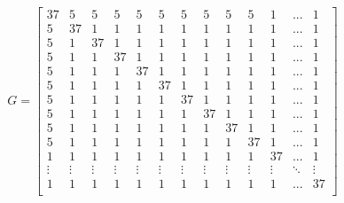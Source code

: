 \[G=
\left[
\begin{smallmatrix}
37 & 5 & 5 & 5 & 5 & 5 & 5 & 5 & 5 & 5 & 1 & ... & 1\\
5 & 37 &1 & 1 & 1 & 1 & 1 & 1 & 1 & 1 & 1 &  ... & 1\\
5 & 1 &37  & 1 & 1 & 1 & 1 & 1 & 1 & 1 & 1 &  ... & 1\\
5 & 1 &1 &37& 1 & 1 & 1 & 1 & 1 & 1 & 1 &   ... & 1\\
5 & 1 &1 & 1 & 37 & 1 & 1 & 1 & 1 & 1 & 1 &  ... & 1\\
5 & 1 &1 & 1 & 1 & 37 & 1 & 1 & 1 & 1 & 1 &  ... & 1\\
5 & 1 &1 & 1 & 1 & 1 & 37 & 1 & 1 & 1 & 1 &  ... & 1\\
5 & 1 &1 & 1 & 1 & 1 & 1 & 37 & 1 & 1 & 1 &  ... & 1\\
5 & 1 &1 & 1 & 1 & 1 & 1 & 1 & 37 & 1 & 1 &  ... & 1\\
5 & 1 &1 & 1 & 1 & 1 & 1 & 1 & 1 & 37 & 1 &  ... & 1\\
1 & 1 &1 & 1 & 1 & 1 & 1 & 1 & 1 & 1 & 37 &  ... & 1\\[-5pt]
\vdots &\vdots & \vdots & \vdots & \vdots & \vdots & 
 \vdots & \vdots & \vdots & \vdots & \vdots & \ddots & \vdots \\
1 & 1 & 1 & 1 & 1 & 1 &1 & 1 & 1 &1 & 1 & ... & 37\\
\end{smallmatrix}
\right]
\]
